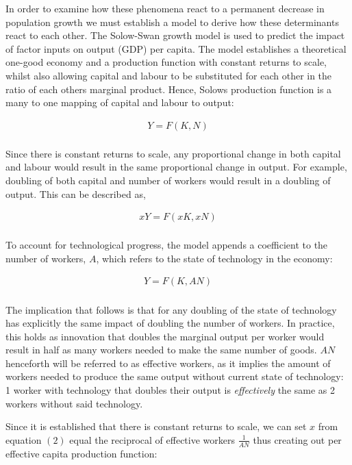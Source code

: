 \documentclass[
]{article}
\begin{document}
In order to examine how these phenomena react to a permanent decrease in
population growth we must establish a model to derive how these
determinants react to each other. The Solow-Swan growth model is used to
predict the impact of factor inputs on output (GDP) per capita. The
model establishes a theoretical one-good economy and a production
function with constant returns to scale, whilst also allowing capital
and labour to be substituted for each other in the ratio of each others
marginal product. Hence, Solow\textquotesingle s production function is
a many to one mapping of capital and labour to output:

{\[\begin{matrix}
{Y = F(K,N)} \\
\end{matrix}\]}

Since there is constant returns to scale, any proportional change in
both capital and labour would result in the same proportional change in
output. For example, doubling of both capital and number of workers
would result in a doubling of output. This can be described as,

{\[\begin{matrix}
{xY = F(xK,xN)} \\
\end{matrix}\]}

To account for technological progress, the model appends a coefficient
to the number of workers, {\(A\)}, which refers to the state of
technology in the economy:

{\[\begin{matrix}
{Y = F(K,AN)} \\
\end{matrix}\]}

The implication that follows is that for any doubling of the state of
technology has explicitly the same impact of doubling the number of
workers. In practice, this holds as innovation that doubles the marginal
output per worker would result in half as many workers needed to make
the same number of goods. {\(AN\)} henceforth will be referred to as
effective workers, as it implies the amount of workers needed to produce
the same output without current state of technology: 1 worker with
technology that doubles their output is \emph{effectively} the same as 2
workers without said technology.

Since it is established that there is constant returns to scale, we can
set {\(x\)} from equation {\((2)\)} equal the reciprocal of effective
workers {\(\frac{1}{AN}\)} thus creating out per effective capita
production function:
\end{document}
